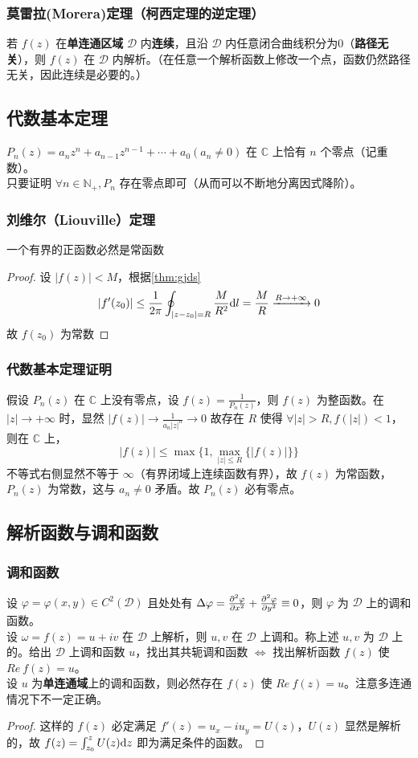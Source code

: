 \documentclass[./main.tex]{subfiles}
\begin{document}
\subsubsection{莫雷拉(Morera)定理（柯西定理的逆定理）}
若 $f(z)$ 在\textbf{单连通区域} $\mathscr{D}$ 内\textbf{连续}，且沿 $\mathscr{D}$ 内任意闭合曲线积分为0（\textbf{路径无关}），则 $f(z)$ 在 $\mathscr{D}$ 内解析。（在任意一个解析函数上修改一个点，函数仍然路径无关，因此连续是必要的。）
\subsection{代数基本定理}
$P_n(z)=a_nz^n+a_{n-1}z^{n-1}+\cdots+a_0(a_n\neq 0)$ 在 $\mathbb{C}$ 上恰有 $n$ 个零点（记重数）。\\
\indent 只要证明 $\forall n\in \mathbb{N}_{+},P_n$ 存在零点即可（从而可以不断地分离因式降阶）。
\subsubsection{刘维尔（Liouville）定理}
一个有界的正函数必然是常函数
\begin{proof}
设 $|f(z)|<M$，根据\eqref{thm:gjds}
$$ |f'(z_0)|\le\frac{1}{2\pi}\oint_{|z-z_0|=R}\frac{M}{R^2}\text{d}l=\frac{M}{R}\xrightarrow[]{R\rightarrow+\infty}0 $$
故 $f(z_0)$ 为常数
\end{proof}
\subsubsection{代数基本定理证明}
假设 $P_n(z)$ 在 $\mathbb{C}$ 上没有零点，设 $f(z)=\frac{1}{P_n(z)}$，则 $f(z)$ 为整函数。在 $|z|\rightarrow+\infty$ 时，显然 $|f(z)|\rightarrow\frac{1}{a_n|z|^n}\rightarrow 0$ 故存在 $R$ 使得 $\forall |z|>R,f(|z|)<1$，则在 $\mathbb{C}$ 上，$$|f(z)|\le\max\{1,\max\limits_{|z|\le R}\{|f(z)|\}\}$$ 不等式右侧显然不等于 $\infty$（有界闭域上连续函数有界），故 $f(z)$ 为常函数，$P_n(z)$ 为常数，这与 $a_n\neq 0$ 矛盾。故 $P_n(z)$ 必有零点。
\subsection{解析函数与调和函数}
\subsubsection{调和函数}
设 $\varphi=\varphi(x,y)\in C^2(\mathscr{D})$ 且处处有 $\Delta\varphi=\frac{\partial^2\varphi}{\partial x^2}+\frac{\partial^2\varphi}{\partial y^2}\equiv0$，则 $\varphi$ 为 $\mathscr{D}$ 上的调和函数。\\
\indent 设 $\omega=f(z)=u+iv$ 在 $\mathscr{D}$ 上解析，则 $u,v$ 在 $\mathscr{D}$ 上调和。称上述 $u,v$ 为 $\mathscr{D}$ 上的。给出 $\mathscr{D}$ 上调和函数 $u$，找出其共轭调和函数 $\iff$  找出解析函数 $f(z)$ 使 $Re\ f(z)=u$。\\
\indent 设 $u$ 为\textbf{单连通域}上的调和函数，则必然存在 $f(z)$ 使 $Re\ f(z)=u$。注意多连通情况下不一定正确。
\begin{proof}
    这样的 $f(z)$ 必定满足  $f'(z)=u_x-iu_y=U(z)$，$U(z)$ 显然是解析的，故 $f(z)=\int_{z_0}^z U(z)\text{d}z$ 即为满足条件的函数。
\end{proof}
\end{document}
